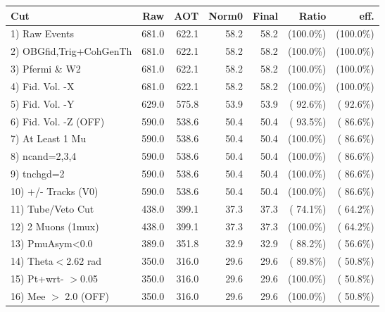  \begin{table}[h!]\centering
 \begin{tabular}{||l||r|r|r|r|r|r||}
 \hline
 \hline
 Cut & Raw & AOT & Norm0 & Final & Ratio & eff.       \\
 \hline
  1) Raw Events           &        681.0 &        622.1 &         58.2 &         58.2 & (100.0\%) & (100.0\%) \\
  2) OBGfid,Trig+CohGenTh &        681.0 &        622.1 &         58.2 &         58.2 & (100.0\%) & (100.0\%) \\
  3) Pfermi \& W2         &        681.0 &        622.1 &         58.2 &         58.2 & (100.0\%) & (100.0\%) \\
  4) Fid. Vol. -X         &        681.0 &        622.1 &         58.2 &         58.2 & (100.0\%) & (100.0\%) \\
  5) Fid. Vol. -Y         &        629.0 &        575.8 &         53.9 &         53.9 & ( 92.6\%) & ( 92.6\%) \\
  6) Fid. Vol. -Z (OFF)   &        590.0 &        538.6 &         50.4 &         50.4 & ( 93.5\%) & ( 86.6\%) \\
  7) At Least 1 Mu        &        590.0 &        538.6 &         50.4 &         50.4 & (100.0\%) & ( 86.6\%) \\
  8) ncand=2,3,4          &        590.0 &        538.6 &         50.4 &         50.4 & (100.0\%) & ( 86.6\%) \\
  9) tnchgd=2             &        590.0 &        538.6 &         50.4 &         50.4 & (100.0\%) & ( 86.6\%) \\
 10) +/- Tracks (V0)      &        590.0 &        538.6 &         50.4 &         50.4 & (100.0\%) & ( 86.6\%) \\
 11) Tube/Veto Cut        &        438.0 &        399.1 &         37.3 &         37.3 & ( 74.1\%) & ( 64.2\%) \\
 12) 2 Muons (1mux)       &        438.0 &        399.1 &         37.3 &         37.3 & (100.0\%) & ( 64.2\%) \\
 13) PmuAsym<0.0          &        389.0 &        351.8 &         32.9 &         32.9 & ( 88.2\%) & ( 56.6\%) \\
 14) Theta$<$2.62 rad     &        350.0 &        316.0 &         29.6 &         29.6 & ( 89.8\%) & ( 50.8\%) \\
 15) Pt+wrt- $>$0.05      &        350.0 &        316.0 &         29.6 &         29.6 & (100.0\%) & ( 50.8\%) \\
 16) Mee $>$ 2.0  (OFF)   &        350.0 &        316.0 &         29.6 &         29.6 & (100.0\%) & ( 50.8\%) \\

\end{tabular}
\end{table}
